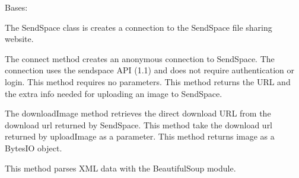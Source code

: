 \documentclass[letterpaper,12pt,openany,oneside]{sphinxmanual}
\begin{document}
\begin{fulllineitems}
\label{Web_Connection:webStegFS.Web_Connection.api_cons.SendSpace}
Bases: 

The SendSpace class is creates a connection to the SendSpace file
sharing website.

\begin{fulllineitems}
\label{Web_Connection:webStegFS.Web_Connection.api_cons.SendSpace.connect}
The connect method creates an anonymous connection to SendSpace.
The connection uses the sendspace API (1.1) and does not require
authentication or login.
This method requires no parameters.
This method returns the URL and the extra info needed for uploading an
image to SendSpace.

\end{fulllineitems}


\begin{fulllineitems}
\label{Web_Connection:webStegFS.Web_Connection.api_cons.SendSpace.downloadImage}
The downloadImage method retrieves the direct download URL from the
download url returned by SendSpace.
This method take the download url returned by uploadImage as a
parameter.
This method returns image as a BytesIO object.

\end{fulllineitems}


\begin{fulllineitems}
\label{Web_Connection:webStegFS.Web_Connection.api_cons.SendSpace.getRequest}
\end{fulllineitems}


\begin{fulllineitems}
\label{Web_Connection:webStegFS.Web_Connection.api_cons.SendSpace.parseXML}
This method parses XML data with the BeautifulSoup module.


\end{fulllineitems}
\end{fulllineitems}
\end{document}
